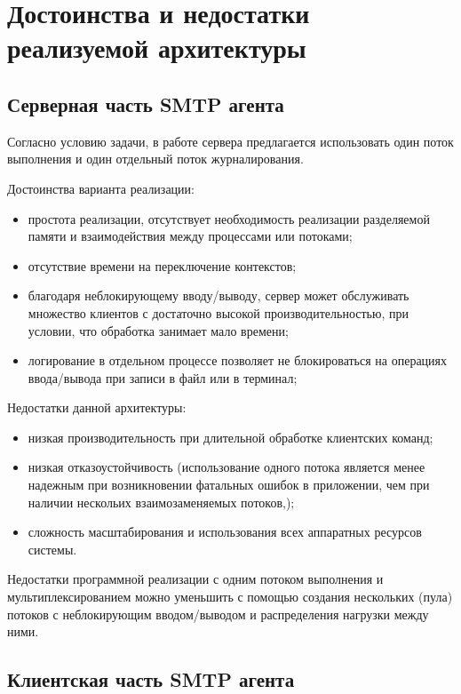 \documentclass[a4paper,12pt]{report}
\begin{document}
\newpage

\section{Достоинства и недостатки реализуемой архитектуры}

\subsection{Серверная часть SMTP агента}

Согласно условию задачи, в работе сервера предлагается использовать один поток выполнения и один отдельный поток
журналирования.

Достоинства варианта реализации:
\begin{itemize}
    \item простота реализации, отсутствует необходимость реализации разделяемой памяти и взаимодействия между процессами или потоками;
    \item отсутствие времени на переключение контекстов;
    \item благодаря неблокирующему вводу/выводу, сервер может обслуживать множество клиентов с достаточно высокой производительностью, при условии, что обработка занимает мало времени;
    \item логирование в отдельном процессе позволяет не блокироваться на операциях ввода/вывода при записи в файл или в терминал;
\end{itemize}

Недостатки данной архитектуры:
\begin{itemize}
    \item низкая производительность при длительной обработке клиентских команд;
    \item низкая отказоустойчивость (использование одного потока является менее надежным при возникновении фатальных ошибок в приложении, чем при наличии нескольих взаимозаменяемых потоков,);
    \item сложность масштабирования и использования всех аппаратных ресурсов системы.
\end{itemize}

Недостатки программной реализации с одним потоком выполнения и мультиплексированием можно уменьшить с  помощью
создания нескольких (пула) потоков с неблокирующим вводом/выводом и распределения нагрузки между ними.

\subsection{Клиентская часть SMTP агента}
\end{document}
